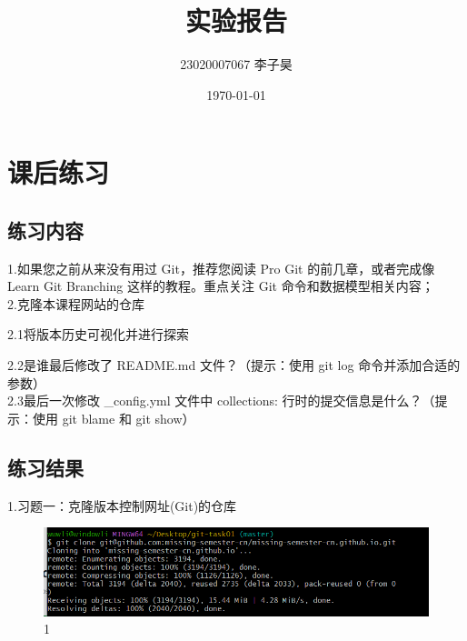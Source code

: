 \documentclass[a4paper, 12pt]{article}
\title{实验报告}
\author{23020007067 李子昊}
\date{\today}
\begin{document}
\maketitle

\large \tableofcontents
\newpage
{}
 
 \section{课后练习}
 \subsection{练习内容}
 \noindent 1.如果您之前从来没有用过 Git，推荐您阅读 Pro Git 的前几章，或者完成像 Learn Git Branching 这样的教程。重点关注 Git 命令和数据模型相关内容；
 \\ 
2.克隆本课程网站的仓库
 
\indent 2.1将版本历史可视化并进行探索


\indent 2.2是谁最后修改了 README.md 文件？（提示：使用 git log 命令并添加合适的参数）\\
\indent 2.3最后一次修改 \_config.yml 文件中 collections: 行时的提交信息是什么？（提示：使用 git blame 和 git show）
\\


 \subsection{练习结果}
1.习题一：克隆版本控制网址(Git)的仓库
 \begin{figure}[H]
  \centering
  \includegraphics[width=1\textwidth]{屏幕截图 2024-08-28 164453.png}
  \caption{1}
    \end{figure}
\end{document}
